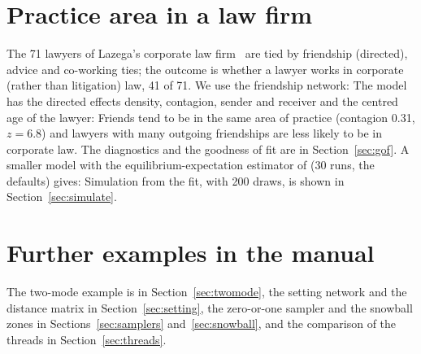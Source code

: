 \section{Practice area in a law firm}\label{sec:ex-lazega}

The 71 lawyers of Lazega's corporate law firm~\cite{lazega2001} are tied by friendship (directed), advice and co-working ties; the outcome is whether a lawyer works in corporate (rather than litigation) law, 41 of 71. We use the friendship network:
The model has the directed effects density, contagion, sender and receiver and the centred age of the lawyer:
Friends tend to be in the same area of practice (contagion 0.31, $z=6.8$) and lawyers with many outgoing friendships are less likely to be in corporate law. The diagnostics and the goodness of fit are in Section~\ref{sec:gof}. A smaller model with the equilibrium-expectation estimator of \alaamee{} (30 runs, the defaults) gives:
Simulation from the fit, with 200 draws, is shown in Section~\ref{sec:simulate}.

\section{Further examples in the manual}

The two-mode example is in Section~\ref{sec:twomode}, the setting network and the distance matrix in Section~\ref{sec:setting}, the zero-or-one sampler and the snowball zones in Sections~\ref{sec:samplers} and~\ref{sec:snowball}, and the comparison of the threads in Section~\ref{sec:threads}.
